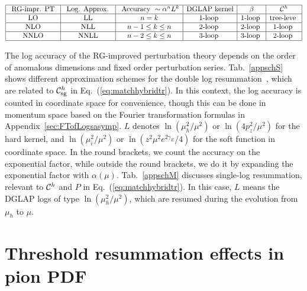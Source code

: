 \documentclass[a4paper,11pt]{article}
\begin{document}
\begin{table}[htbp]
\begin{equation}
\begin{array}{|c|c|c|c|c|c|}
\hline \text { RG-impr. PT } & \text { Log. Approx. } & \text { Accuracy } \sim \alpha^n L^k & \text{DGLAP kernel} & \beta & {\cal C}^{h}\\
\hline \mathrm{LO} & \text { LL } & n=k  & \text {1-loop } & \text {1-loop } & \text {tree-leve } \\
\hline \mathrm{NLO} & \text { NLL } & n-1 \leq k \leq n  &  \text {2-loop } & \text {2-loop } & \text {1-loop } \\
\hline \text { NNLO } & \text { NNLL } & n-2 \leq k \leq n  & \text {3-loop } &  \text {3-loop } & \text {2-loop } \\
\hline
\end{array} \nonumber
\end{equation}
\caption{Different approximation schemes for the full matching kernel ${\cal C}^{h}$ and DGLAP evolution kernel $P$.}
\label{appschM}
\end{table}
The log accuracy of the RG-improved perturbation theory depends on the order of anomalous dimensions and fixed order perturbation series. Tab.~\ref{appschS} shows different approximation schemes for the double log resummation~\cite{Becher:2006mr,Becher:2007ty}, which are related to ${\cal C}^{h}_{\rm sg}$ in Eq.~(\ref{eq:matchhybridtr}). In this context, the log accuracy is counted in coordinate space for convenience, though this can be done in momentum space based on the Fourier transformation formulas in Appendix~\ref{sec:FTofLogsasymp}. $L$ denotes $\ln \left(\mu_h^2/\mu^2\right)$ or $\ln\left(4 p_z^2/\mu^2\right)$ for the hard kernel, and $\ln\left(\mu_i^2/\mu^2\right)$ or $\ln\left(z^2 \mu^2 e^{2\gamma_E}/4\right)$ for the soft function in coordinate space. In the round brackets, we count the accuracy on the exponential factor, while outside the round brackets, we do it by expanding the exponential factor with $\alpha(\mu)$. Tab.~\ref{appschM} discusses single-log resummation, relevant to ${\cal C}^{h}$ and $P$ in Eq.~(\ref{eq:matchhybridtr}). In this case, $L$ means the DGLAP logs of type $\ln \left(\mu_h^2/\mu^2\right)$, which are resumed during the evolution from $\mu_h$ to $\mu$. 


\section{Threshold resummation effects in pion PDF}\label{sec:pionPDF}
\end{document}
